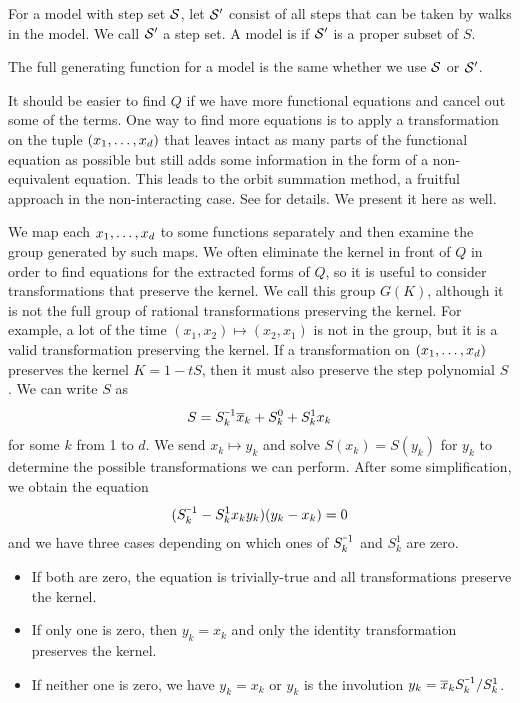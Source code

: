 \begin{defn}For a model with step set $\mathcal{S}$, let $\mathcal{S}'$ consist of all steps that can be taken by walks in the model. We call $\mathcal{S}'$ a  step set. A model is  if $\mathcal{S}'$ is a proper subset of $S$.
\end{defn}

\begin{prop} The full generating function for a model is the same whether we use $\mathcal{S}$ or $\mathcal{S}'$.
\end{prop}

It should be easier to find $Q$ if we have more functional equations and cancel out some of the terms. One way to find more equations is to apply a transformation on the tuple $(x_1,\ldots, x_d)$ that leaves intact as many parts of the functional equation as possible but still adds some information in the form of a non-equivalent equation. This leads to the orbit summation method, a fruitful approach in the non-interacting case. See \cite[p.~11]{bousquet2010walks} for details. We present it here as well.

We map each $x_1,\ldots, x_d$ to some functions separately and then examine the group generated by such maps. We often eliminate the kernel in front of $Q$ in order to find equations for the extracted forms of $Q$, so it is useful to consider transformations that preserve the kernel. We call this group $G(K)$, although it is not the full group of rational transformations preserving the kernel. For example, a lot of the time $(x_1,x_2) \mapsto (x_2,x_1)$ is not in the group, but it is a valid transformation preserving the kernel. If a transformation on $(x_1,\ldots, x_d)$ preserves the kernel $K = 1 -t S$, then it must also preserve the step polynomial $S$. We can write $S$ as
\begin{align}
	S = S_k^{\um 1} \ol x_k + S_k^0 + S_k^1 x_k
\end{align}
for some $k$ from 1 to $d$. We send $x_k \mapsto y_k$ and solve $S(x_k) = S(y_k)$ for $y_k$ to determine the possible transformations we can perform. After some simplification, we obtain the equation
\begin{align}
	(S_k^{\um 1} - S_k^1 x_k y_k)(y_k-x_k) = 0
\end{align}
and we have three cases depending on which ones of $S_k^{\um 1}$ and $S_k^1$ are zero.
\begin{itemize}
	\item[1.] If both are zero, the equation is trivially-true and all transformations preserve the kernel.
	\item[2.] If only one is zero, then $y_k = x_k$ and only the identity transformation preserves the kernel.
	\item[3.] If neither one is zero, we have $y_k = x_k$ or $y_k$ is the involution $y_k = \ol x_k S_k^{\um 1}/S_k^1$.
\end{itemize}

